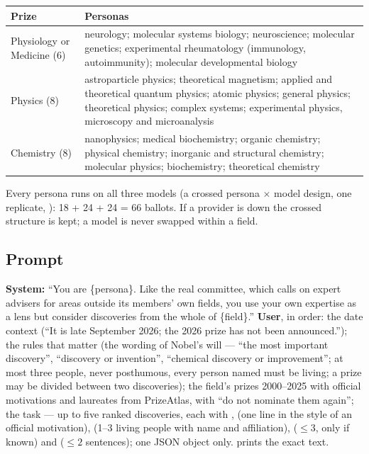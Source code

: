 \documentclass[11pt,a4paper]{article}
\begin{document}
\begin{center}
\small
\begin{tabularx}{\textwidth}{@{}lL@{}}
\toprule
Prize & Personas \\
\midrule
Physiology or Medicine (6) & neurology; molecular systems biology; neuroscience; molecular genetics; experimental rheumatology (immunology, autoimmunity); molecular developmental biology \\
Physics (8) & astroparticle physics; theoretical magnetism; applied and theoretical quantum physics; atomic physics; general physics; theoretical physics; complex systems; experimental physics, microscopy and microanalysis \\
Chemistry (8) & nanophysics; medical biochemistry; organic chemistry; physical chemistry; inorganic and structural chemistry; molecular physics; biochemistry; theoretical chemistry \\
\bottomrule
\end{tabularx}
\end{center}

\noindent Every persona runs on all three models (a crossed persona $\times$ model design, one replicate,
): 18 + 24 + 24 = 66 ballots. If a provider is down the crossed structure is kept; a model is never swapped
within a field.

\subsection{Prompt}

\textbf{System:} ``You are \{persona\}. Like the real committee, which calls on expert advisers for areas outside its
members' own fields, you use your own expertise as a lens but consider discoveries from the whole of \{field\}.''
\textbf{User}, in order: the date context (``It is late September 2026; the 2026 prize has not been announced.''); the
rules that matter (the wording of Nobel's will --- ``the most important discovery'', ``discovery or invention'',
``chemical discovery or improvement''; at most three people, never posthumous, every person named must be living; a
prize may be divided between two discoveries); the field's prizes 2000--2025 with official motivations and laureates
from PrizeAtlas, with ``do not nominate them again''; the task --- up to five ranked discoveries, each with
,  (one line in the style of an official motivation),  (1--3 living people
with name and affiliation),  ($\leq 3$, only if known) and  ($\leq 2$ sentences); one
JSON object only.  prints the exact text.
\end{document}
